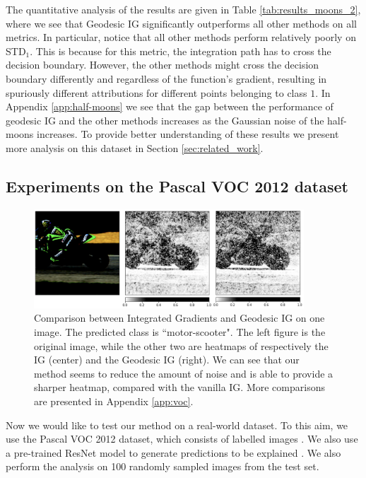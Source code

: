 The quantitative analysis of the results are given in Table \ref{tab:results_moons_2}, where we see that Geodesic IG significantly outperforms all other methods on all metrics. In particular, notice that all other methods perform relatively poorly on STD$_1$. This is because for this metric, the integration path has to cross the decision boundary. However, the other methods might cross the decision boundary differently and regardless of the function's gradient, resulting in spuriously different attributions for different points belonging to class $1$. In Appendix \ref{app:half-moons} we see that the gap between the performance of geodesic IG and the other methods increases as the Gaussian noise of the half-moons increases. To provide better understanding of these results we present more analysis on this dataset in Section \ref{sec:related_work}.

\subsection{Experiments on the Pascal VOC 2012 dataset}
\label{subsec:voc}

\begin{figure}[ht]
\vskip 0.2in
\begin{center}
\centerline{\includegraphics[width=0.9\textwidth]{figures/images.png}}
\caption{Comparison between Integrated Gradients and Geodesic IG on one image. The predicted class is ``motor-scooter". The left figure is the original image, while the other two are heatmaps of respectively the IG (center) and the Geodesic IG (right). We can see that our method seems to reduce the amount of noise and is able to provide a sharper heatmap, compared with the vanilla IG. More comparisons are presented in Appendix \ref{app:voc}.}
\label{fig:qualitative-comp}
\end{center}
\vskip -0.2in
\end{figure}

Now we would like to test our method on a real-world dataset. To this aim, we use the Pascal VOC 2012 dataset, which consists of labelled images \citep{pascal-voc-2012}. We also use a pre-trained ResNet model to generate predictions to be explained \citep{he2016deep}. We also perform the analysis on 100 randomly sampled images from the test set.

